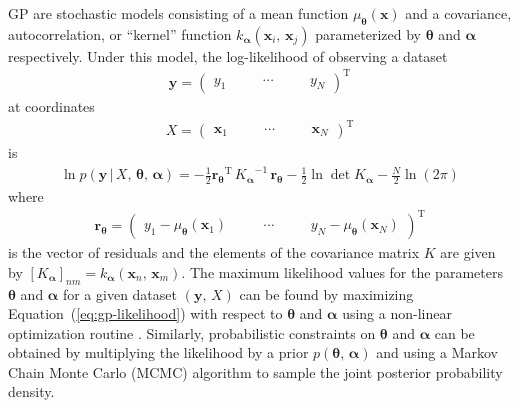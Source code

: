 \documentclass[manuscript, letterpaper]{aastex6}
\makeatletter
\let\origsection\section
\renewcommand\section{\@ifstar{\starsection}{\nostarsection}}
\newcommand\nostarsection[1]{\sectionprelude\origsection{#1}}
\newcommand\starsection[1]{\sectionprelude\origsection*{#1}}
\newcommand\sectionprelude{\vspace{1em}}
\renewcommand{\eqref}[1]{\ref{eq:#1}}
\newcommand{\Eq}[1]{Equation~(\eqref{#1})}
\newcommand{\eq}[1]{\Eq{#1}}
\newcommand{\eqlabel}[1]{\label{eq:#1}}
\newcommand{\sectlabel}[1]{\label{sect:#1}}
\newcommand{\T}{\ensuremath{\mathrm{T}}}
\newcommand{\bvec}[1]{{\ensuremath{\boldsymbol{#1}}}}
\makeatother
\begin{document}
\section{Gaussian processes}\sectlabel{gps}

GP are stochastic models consisting of a mean function
$\mu_\bvec{\theta}(\bvec{x})$ and a covariance, autocorrelation, or ``kernel''
function $k_\bvec{\alpha}(\bvec{x}_i,\,\bvec{x}_j)$ parameterized by
$\bvec{\theta}$ and $\bvec{\alpha}$ respectively.
Under this model, the log-likelihood of observing a dataset
\begin{eqnarray}
\bvec{y} = \left(\begin{array}{ccccc}
    y_1\quad && \cdots\quad && y_N
\end{array}\right)^\T
\end{eqnarray}
at coordinates
\begin{eqnarray}
X = \left(\begin{array}{ccccc}
    \bvec{x}_1\quad && \cdots\quad && \bvec{x}_N
\end{array}\right)^\T
\end{eqnarray}
is
\begin{eqnarray}\eqlabel{gp-likelihood}
\ln{p(\bvec{y}\,|\,{X,\,\bvec{\theta}},\,\bvec{\alpha})} =
    -\frac{1}{2} {\bvec{r}_\bvec{\theta}}^\T\,{K_\bvec{\alpha}}^{-1}\,
        \bvec{r}_\bvec{\theta}
    -\frac{1}{2}\ln\det K_\bvec{\alpha}
    - \frac{N}{2} \ln{(2\pi)}
\end{eqnarray}
where
\begin{eqnarray}
    \bvec{r}_\bvec{\theta} = \left(\begin{array}{ccccc}
    y_1 - \mu_\bvec{\theta}(\bvec{x}_1)\quad && \cdots\quad &&
    y_N - \mu_\bvec{\theta}(\bvec{x}_N)
\end{array}\right)^\T
\end{eqnarray}
is the vector of residuals and the elements of the covariance matrix $K$ are
given by $[K_\bvec{\alpha}]_{nm} = k_\bvec{\alpha}(\bvec{x}_n,\,\bvec{x}_m)$.
The maximum likelihood values for the parameters $\bvec{\theta}$ and
$\bvec{\alpha}$ for a given dataset $(\bvec{y},\,X)$ can be found by
maximizing \eq{gp-likelihood} with respect to $\bvec{\theta}$ and
$\bvec{\alpha}$ using a non-linear optimization routine \citep{Nocedal:2006}.
Similarly, probabilistic constraints on $\bvec{\theta}$ and $\bvec{\alpha}$
can be obtained by multiplying the likelihood by a prior
$p(\bvec{\theta},\,\bvec{\alpha})$ and using a Markov Chain Monte Carlo (MCMC)
algorithm to sample the joint posterior probability density.
\end{document}
